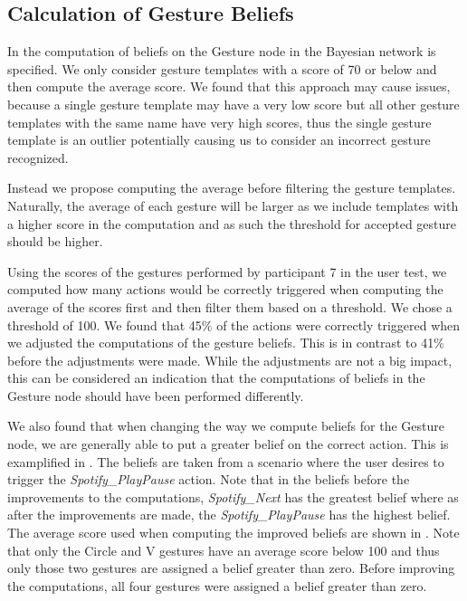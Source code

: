 \subsection{Calculation of Gesture Beliefs}

In  the computation of beliefs on the Gesture node in the Bayesian network is specified. We only consider gesture templates with a score of 70 or below and then compute the average score. We found that this approach may cause issues, because a single gesture template may have a very low score but all other gesture templates with the same name have very high scores, thus the single gesture template is an outlier potentially causing us to consider an incorrect gesture recognized.

Instead we propose computing the average before filtering the gesture templates. Naturally, the average of each gesture will be larger as we include templates with a higher score in the computation and as such the threshold for accepted gesture should be higher.

Using the scores of the gestures performed by participant 7 in the user test, we computed how many actions would be correctly triggered when computing the average of the scores first and then filter them based on a threshold. We chose a threshold of 100. We found that 45\% of the actions were correctly triggered when we adjusted the computations of the gesture beliefs. This is in contrast to 41\% before the adjustments were made. While the adjustments are not a big impact, this can be considered an indication that the computations of beliefs in the Gesture node should have been performed differently.

We also found that when changing the way we compute beliefs for the Gesture node, we are generally able to put a greater belief on the correct action. This is examplified in . The beliefs are taken from a scenario where the user desires to trigger the \emph{Spotify\_PlayPause} action. Note that in the beliefs before the improvements to the computations, \emph{Spotify\_Next} has the greatest belief where as after the improvements are made, the \emph{Spotify\_PlayPause} has the highest belief.
The average score used when computing the improved beliefs are shown in . Note that only the Circle and V gestures have an average score below 100 and thus only those two gestures are assigned a belief greater than zero. Before improving the computations, all four gestures were assigned a belief greater than zero.

